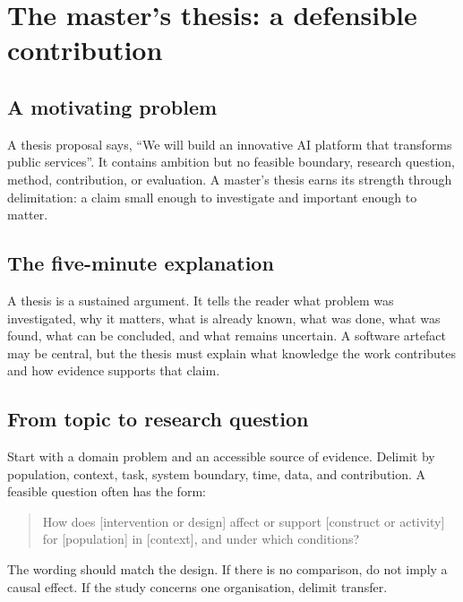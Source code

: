 \chapter{The master's thesis: a defensible contribution}
\label{ch:thesis}

\section{A motivating problem}
A thesis proposal says, \enquote{We will build an innovative AI platform that transforms public services}. It contains ambition but no feasible boundary, research question, method, contribution, or evaluation. A master's thesis earns its strength through delimitation: a claim small enough to investigate and important enough to matter.


\section{The five-minute explanation}
A thesis is a sustained argument. It tells the reader what problem was investigated, why it matters, what is already known, what was done, what was found, what can be concluded, and what remains uncertain. A software artefact may be central, but the thesis must explain what knowledge the work contributes and how evidence supports that claim.

\section{From topic to research question}
Start with a domain problem and an accessible source of evidence. Delimit by population, context, task, system boundary, time, data, and contribution. A feasible question often has the form:
\begin{quote}
How does [intervention or design] affect or support [construct or activity] for [population] in [context], and under which conditions?
\end{quote}
The wording should match the design. If there is no comparison, do not imply a causal effect. If the study concerns one organisation, delimit transfer.

